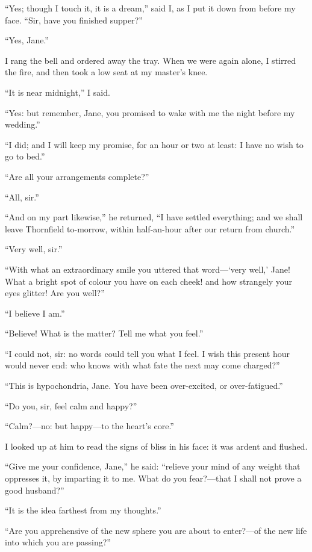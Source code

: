 \enquote{Yes; though I touch it, it is a dream,} said I, as I put it
down from before my face.  \enquote{Sir, have you finished supper?}

\enquote{Yes, Jane.}

I rang the bell and ordered away the tray.  When we were again alone, I
stirred the fire, and then took a low seat at my master's knee.

\enquote{It is near midnight,} I said.

\enquote{Yes: but remember, Jane, you promised to wake with me the night
	before my wedding.}

\enquote{I did; and I will keep my promise, for an hour or two at least:
	I have no wish to go to bed.}

\enquote{Are all your arrangements complete?}

\enquote{All, sir.}

\enquote{And on my part likewise,} he returned, \enquote{I have settled
	everything; and we shall leave Thornfield to-morrow, within half-an-hour
	after our return from church.}

\enquote{Very well, sir.}

\enquote{With what an extraordinary smile you uttered that word---\enquote{very
		well,} Jane!  What a bright spot of colour you have on each cheek! and
	how strangely your eyes glitter!  Are you well?}

\enquote{I believe I am.}

\enquote{Believe!  What is the matter?  Tell me what you feel.}

\enquote{I could not, sir: no words could tell you what I feel.  I wish
	this present hour would never end: who knows with what fate the next may
	come charged?}

\enquote{This is hypochondria, Jane.  You have been over-excited, or
	over-fatigued.}

\enquote{Do you, sir, feel calm and happy?}

\enquote{Calm?---no: but happy---to the heart's core.}

I looked up at him to read the signs of bliss in his face: it was ardent
and flushed.

\enquote{Give me your confidence, Jane,} he said: \enquote{relieve your
	mind of any weight that oppresses it, by imparting it to me.  What do
	you fear?---that I shall not prove a good husband?}

\enquote{It is the idea farthest from my thoughts.}

\enquote{Are you apprehensive of the new sphere you are about to
	enter?---of the new life into which you are passing?}

